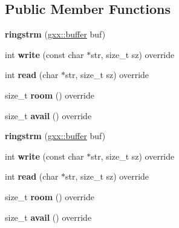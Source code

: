 \subsection*{Public Member Functions}
\begin{DoxyCompactItemize}
\item 
{\bfseries ringstrm} (\hyperlink{classgxx_1_1buffer}{gxx\+::buffer} buf)\hypertarget{classgxx_1_1io_1_1ringstrm_a8853f624db0b82d5d5e74d98a64eb719}{}\label{classgxx_1_1io_1_1ringstrm_a8853f624db0b82d5d5e74d98a64eb719}

\item 
int {\bfseries write} (const char $\ast$str, size\+\_\+t sz) override\hypertarget{classgxx_1_1io_1_1ringstrm_ab02d949b341edb2d358d6951ce022d4a}{}\label{classgxx_1_1io_1_1ringstrm_ab02d949b341edb2d358d6951ce022d4a}

\item 
int {\bfseries read} (char $\ast$str, size\+\_\+t sz) override\hypertarget{classgxx_1_1io_1_1ringstrm_a43ab52d8e77d95c132f1b2e5ac1df049}{}\label{classgxx_1_1io_1_1ringstrm_a43ab52d8e77d95c132f1b2e5ac1df049}

\item 
size\+\_\+t {\bfseries room} () override\hypertarget{classgxx_1_1io_1_1ringstrm_a9c9b15c0384aeb64540b943bc1a30cc8}{}\label{classgxx_1_1io_1_1ringstrm_a9c9b15c0384aeb64540b943bc1a30cc8}

\item 
size\+\_\+t {\bfseries avail} () override\hypertarget{classgxx_1_1io_1_1ringstrm_a54386d2cb61dd37fd2aded74ddbfef0d}{}\label{classgxx_1_1io_1_1ringstrm_a54386d2cb61dd37fd2aded74ddbfef0d}

\item 
{\bfseries ringstrm} (\hyperlink{classgxx_1_1buffer}{gxx\+::buffer} buf)\hypertarget{classgxx_1_1io_1_1ringstrm_a8853f624db0b82d5d5e74d98a64eb719}{}\label{classgxx_1_1io_1_1ringstrm_a8853f624db0b82d5d5e74d98a64eb719}

\item 
int {\bfseries write} (const char $\ast$str, size\+\_\+t sz) override\hypertarget{classgxx_1_1io_1_1ringstrm_ab02d949b341edb2d358d6951ce022d4a}{}\label{classgxx_1_1io_1_1ringstrm_ab02d949b341edb2d358d6951ce022d4a}

\item 
int {\bfseries read} (char $\ast$str, size\+\_\+t sz) override\hypertarget{classgxx_1_1io_1_1ringstrm_a43ab52d8e77d95c132f1b2e5ac1df049}{}\label{classgxx_1_1io_1_1ringstrm_a43ab52d8e77d95c132f1b2e5ac1df049}

\item 
size\+\_\+t {\bfseries room} () override\hypertarget{classgxx_1_1io_1_1ringstrm_a9c9b15c0384aeb64540b943bc1a30cc8}{}\label{classgxx_1_1io_1_1ringstrm_a9c9b15c0384aeb64540b943bc1a30cc8}

\item 
size\+\_\+t {\bfseries avail} () override\hypertarget{classgxx_1_1io_1_1ringstrm_a54386d2cb61dd37fd2aded74ddbfef0d}{}\label{classgxx_1_1io_1_1ringstrm_a54386d2cb61dd37fd2aded74ddbfef0d}

\end{DoxyCompactItemize}
